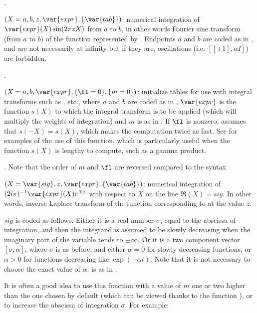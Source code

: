 .

$(X=a,b,z,\var{expr},\{\var{tab}\})$: \label{se:intfouriersin}numerical
integration of $\var{expr}(X)\sin(2\pi zX)$ from $a$ to $b$, in other words
Fourier sine transform (from $a$ to $b$) of the function represented by
. Endpoints $a$ and $b$ are coded as in , and are not
necessarily at infinity but if they are, oscillations (i.e. $[[\pm1],\alpha
I]$) are forbidden.

.

$(X=a,b,\var{expr},\{\fl=0\},\{m=0\})$: \label{se:intfuncinit}initialize tables for use with integral transforms such as ,
etc., where $a$ and $b$ are coded as in , $\var{expr}$ is the
function $s(X)$ to which the integral transform is to be applied (which will
multiply the weights of integration) and $m$ is as in . If
$\fl$ is nonzero, assumes that $s(-X)=\overline{s(X)}$, which makes the
computation twice as fast. See  for examples of the
use of this function, which is particularly useful when the function $s(X)$
is lengthy to compute, such as a gamma product.

. Note that the order of $m$ and $\fl$ are reversed compared
to the  syntax.

$(X=\var{sig},z,\var{expr},\{\var{tab}\})$: \label{se:intlaplaceinv}numerical integration of $(2i\pi)^{-1}\var{expr}(X)e^{Xz}$ with respect
to $X$ on the line $\Re(X)=sig$. In other words, inverse Laplace transform
of the function corresponding to  at the value $z$.

$sig$ is coded as follows. Either it is a real number $\sigma$, equal to the
abscissa of integration, and then the integrand is assumed to
be slowly decreasing when the imaginary part of the variable tends to
$\pm\infty$. Or it is a two component vector $[\sigma,\alpha]$, where
$\sigma$ is as before, and either $\alpha=0$ for slowly decreasing functions,
or $\alpha>0$ for functions decreasing like $\exp(-\alpha t)$. Note that it
is not necessary to choose the exact value of $\alpha$.  is as in
.

It is often a good idea to use this function with a value of $m$ one or two
higher than the one chosen by default (which can be viewed thanks to the
function ), or to increase the abscissa of integration
$\sigma$. For example:

